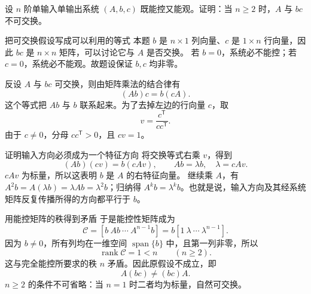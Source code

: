 \documentclass[11pt]{article}
\begin{document}
\begin{problem}[原题 9]
设 $n$ 阶单输入单输出系统 $(A,b,c)$ 既能控又能观。证明：当 $n\ge2$ 时，$A$ 与 $bc$ 不可交换。
\end{problem}
\begin{solution}
\begin{proofstep}{把可交换假设写成可以利用的等式}
本题 $b$ 是 $n\times1$ 列向量、$c$ 是 $1\times n$ 行向量，因此 $bc$ 是 $n\times n$
矩阵，可以讨论它与 $A$ 是否交换。
若 $b=0$，系统必不能控；若 $c=0$，系统必不能观。故题设保证 $b,c$ 均非零。

反设 $A$ 与 $bc$ 可交换，则由矩阵乘法的结合律有
\[
(Ab)c=b(cA).
\]
这个等式把 $Ab$ 与 $b$ 联系起来。为了去掉左边的行向量 $c$，取
\[
v=\frac{c^{\mathsf T}}{cc^{\mathsf T}}.
\]
由于 $c\ne0$，分母 $cc^{\mathsf T}>0$，且 $cv=1$。
\end{proofstep}

\begin{proofstep}{证明输入方向必须成为一个特征方向}
将交换等式右乘 $v$，得到
\[
(Ab)(cv)=b(cAv),\qquad
Ab=\lambda b,\quad \lambda=cAv.
\]
$cAv$ 为标量，所以这表明 $b$ 是 $A$ 的右特征向量。
继续乘 $A$，有 $A^2b=A(\lambda b)=\lambda Ab=\lambda^2b$；归纳得
$A^kb=\lambda^kb$。也就是说，输入方向及其经系统矩阵反复传播所得的方向都平行于 $b$。
\end{proofstep}

\begin{proofstep}{用能控矩阵的秩得到矛盾}
于是能控性矩阵成为
\[
\mathcal C=[b\ Ab\ \cdots\ A^{n-1}b]
=b[1\ \lambda\ \cdots\ \lambda^{n-1}].
\]
因为 $b\ne0$，所有列均在一维空间 $\operatorname{span}\{b\}$ 中，且第一列非零，所以
\[
\operatorname{rank}\mathcal C=1<n\qquad(n\ge2).
\]
这与完全能控所要求的秩 $n$ 矛盾。因此原假设不成立，即
\[
\boxed{A(bc)\ne(bc)A.}
\]
$n\ge2$ 的条件不可省略：当 $n=1$ 时二者均为标量，自然可交换。
\end{proofstep}
\end{solution}
\end{document}
